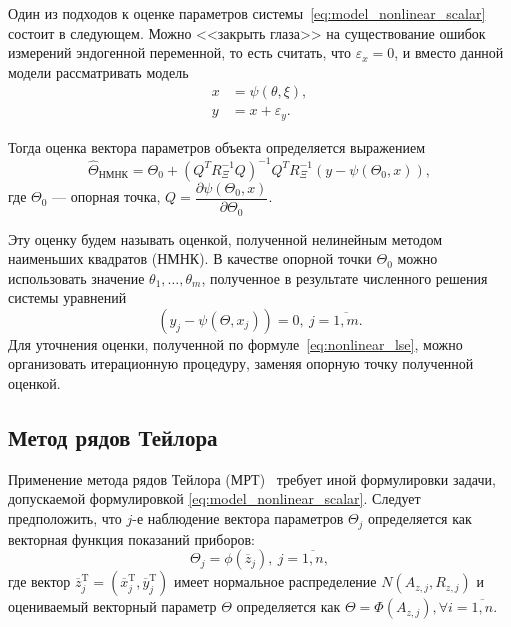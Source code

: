 Один из подходов к оценке параметров системы~\eqref{eq:model_nonlinear_scalar} состоит в следующем.
Можно <<закрыть глаза>> на существование ошибок измерений
эндогенной переменной, то есть считать, что \( \varepsilon_x = 0 \),
и вместо данной модели рассматривать модель
\begin{equation}
  \label{eq:model_nonlinear_lse}
  \begin{aligned}
  x &= \psi(\theta, \xi), \\
  y &= x + \varepsilon_y.
  \end{aligned}
\end{equation}

Тогда оценка вектора параметров объекта определяется выражением~\cite{mukha_2009}
\begin{equation}
  \label{eq:nonlinear_lse}
  \hat{\Theta}_{\text{НМНК}} =
  \Theta_0 + (Q^T R^{-1}_{\Xi} Q)^{-1} Q^T R^{-1}_{\Xi} (y - \psi(\Theta_0, x)),
\end{equation}
где \( \Theta_0 \) --- опорная точка,
\( Q = \dfrac{\partial \psi(\Theta_0, x) }{ \partial \Theta_0 } \).

Эту оценку будем называть оценкой, полученной нелинейным
методом наименьших квадратов (НМНК).
В качестве опорной точки \( \Theta_0 \) можно использовать значение
\( \theta_1, \dotsc, \theta_m \),
полученное в результате численного решения системы уравнений
\begin{equation}
  \label{eq:basic}
  (y_j - \psi( \Theta, x_j )) = 0, \: j = \overline{1,m}.
\end{equation}
Для уточнения оценки, полученной по формуле~\eqref{eq:nonlinear_lse}, можно
организовать итерационную процедуру, заменяя опорную точку полученной оценкой.

\newpage
\subsection{Метод рядов Тейлора}

Применение метода рядов Тейлора (МРТ)~\cite{mukha_2000}
требует иной формулировки задачи, допускаемой формулировкой \eqref{eq:model_nonlinear_scalar}.
Следует предположить, что \( j \)-е наблюдение вектора параметров \( \Theta_j \)
определяется как векторная функция показаний приборов:
\begin{equation}
  \label{eq:mrt_phi}
  \Theta_j = \phi( \overline{z}_{j} ), \: j = \overline{1, n},
\end{equation}
где вектор
\( \overline{z}^{\text{T}}_{j} =
( \overline{x}^{\text{T}}_{j}, \overline{y}^{\text{T}}_{j}) \)
имеет нормальное распределение \( N(A_{z,j}, R_{z,j}) \)
и оцениваемый векторный параметр \( \Theta \) определяется как
\( \Theta = \Phi(A_{z,j}), \forall i = \overline{1, n} \).

